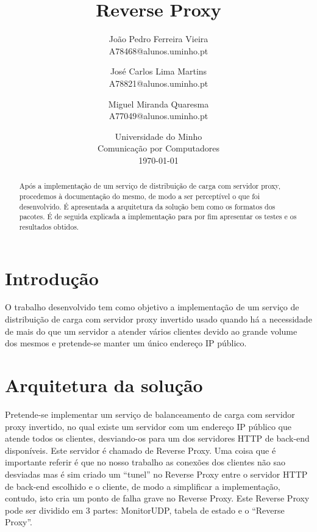 \documentclass{article}
\begin{document}
\title{\textbf{Reverse Proxy}}
\author{João Pedro Ferreira Vieira\\
		A78468@alunos.uminho.pt \and
		José Carlos Lima Martins\\
        A78821@alunos.uminho.pt \and
        Miguel Miranda Quaresma\\
        A77049@alunos.uminho.pt}
\date{Universidade do Minho\\
	  Comunicação por Computadores\\[2ex]%
      \today}
\maketitle

\begin{abstract}
Após a implementação de um serviço de distribuição de carga com servidor proxy, procedemos à documentação do mesmo, de modo a ser perceptível o que foi desenvolvido. É apresentada a arquitetura da solução bem como os formatos dos pacotes. É de seguida explicada a implementação para por fim apresentar os testes e os resultados obtidos.
\end{abstract}

\section{Introdução}
O trabalho desenvolvido tem como objetivo a implementação de um serviço de distribuição de carga com servidor proxy invertido usado quando há a necessidade de mais do que um servidor a atender vários clientes devido ao grande volume dos mesmos e pretende-se manter um único endereço IP público.

\section{Arquitetura da solução}
Pretende-se implementar um serviço de balanceamento de carga com servidor proxy invertido, no qual existe um servidor com um endereço IP público que atende todos os clientes, desviando-os para um dos servidores HTTP de back-end disponíveis. 
Este servidor é chamado de Reverse Proxy. Uma coisa que é importante referir é que no nosso trabalho as conexões dos clientes não sao desviadas mas é sim criado um ``tunel'' no Reverse Proxy entre o servidor HTTP de back-end escolhido e o cliente, de modo a simplificar a implementação, contudo, isto cria um ponto de falha grave no Reverse Proxy.
Este Reverse Proxy pode ser dividido em 3 partes: MonitorUDP, tabela de estado e o ``Reverse Proxy''. 
\end{document}

